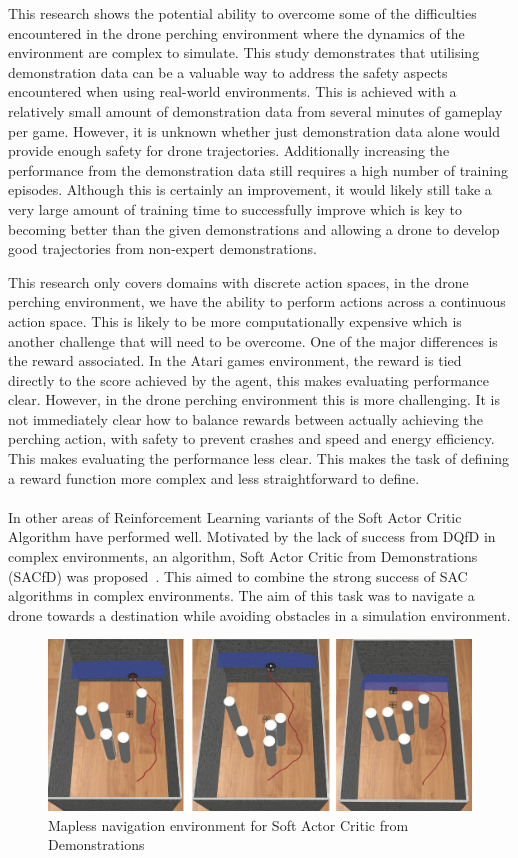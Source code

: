 This research shows the potential ability to overcome some of the difficulties encountered in the drone perching environment where the dynamics of the environment are complex to simulate.
This study demonstrates that utilising demonstration data can be a valuable way to address the safety aspects encountered when using real-world environments.
This is achieved with a relatively small amount of demonstration data from several minutes of gameplay per game.
However, it is unknown whether just demonstration data alone would provide enough safety for drone trajectories.
Additionally increasing the performance from the demonstration data still requires a high number of training episodes.
Although this is certainly an improvement, it would likely still take a very large amount of training time to successfully improve which is key to becoming better than the given demonstrations and allowing a drone to develop good trajectories from non-expert demonstrations.

This research only covers domains with discrete action spaces, in the drone perching environment, we have the ability to perform actions across a continuous action space.
This is likely to be more computationally expensive which is another challenge that will need to be overcome.
One of the major differences is the reward associated.
In the Atari games environment, the reward is tied directly to the score achieved by the agent, this makes evaluating performance clear.
However, in the drone perching environment this is more challenging.
It is not immediately clear how to balance rewards between actually achieving the perching action, with safety to prevent crashes and speed and energy efficiency.
This makes evaluating the performance less clear.
This makes the task of defining a reward function more complex and less straightforward to define. \\\\

In other areas of Reinforcement Learning variants of the Soft Actor Critic Algorithm have performed well.
Motivated by the lack of success from DQfD in complex environments, an algorithm, Soft Actor Critic from Demonstrations (SACfD) was proposed~\cite{SACfDMaplessNavigation}.
This aimed to combine the strong success of SAC algorithms in complex environments.
The aim of this task was to navigate a drone towards a destination while avoiding obstacles in a simulation environment.

\begin{figure}[htbp]
  \centering
  \includegraphics[width=\textwidth]{background/fyp17-sacfd.png}
  \caption{Mapless navigation environment for Soft Actor Critic from Demonstrations}
\label{fig:fyp17-sacfd}
\end{figure}

